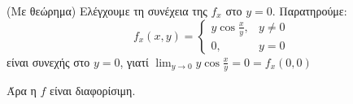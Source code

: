 \begin{examples}
\begin{enumerate}
\begin{solution}{(Με θεώρημα)}
                        Ελέγχουμε τη συνέχεια της $ f_{x} $ στο $ y=0 $. Παρατηρούμε:
                        \[
                            f_{x}(x,y) = \begin{cases} y \cos{\frac{x}{y}}, & y \neq 0 \\ 0, & y=0 \end{cases}  
                         \] 
                         είναι συνεχής στο $ y=0 $, γιατί $ \lim_{y \to 0} y \cos{\frac{x}{y}
                         } = 0 = f_{x}(0,0) $
                         
                         Άρα η $f$ είναι διαφορίσιμη.
                    \end{solution}
            \end{enumerate}
        \end{examples}
        
            
